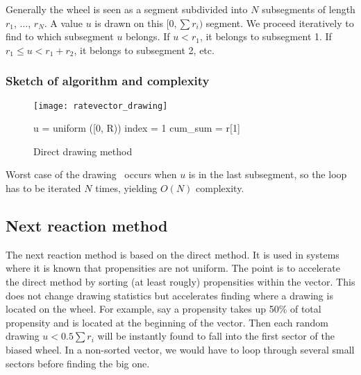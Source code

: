 Generally the wheel is seen as a segment subdivided into $N$ subsegments of length $r_1$, ..., $r_N$. A value $u$ is drawn on this $[0, \sum r_i)$ segment. We proceed iteratively to find to which subsegment $u$ belongs. If $u < r_1$, it belongs to subsegment 1. If $r_1 \leq u < r_1+r_2$, it belongs to subsegment 2, etc.

\subsubsection {Sketch of algorithm and complexity} 

\begin{figure}[!h]
  \begin{minipage}{0.5\textwidth}
    \texttt{[image: ratevector\_drawing]}
  \end{minipage}
  \begin{minipage}{0.5\textwidth}
    \begin{algorithm}[H]
      u = uniform ([0, R))\;
        index = 1\;
        cum\_sum = r[1]\;
    \end{algorithm}
  \end{minipage}
  \caption{Direct drawing method}
  \label{fig:direct_drawing}
\end {figure}

Worst case of the drawing~ occurs when $u$ is in the last subsegment, so the loop has to be iterated $N$ times, yielding $O(N)$ complexity.

\subsection {Next reaction method}

The next reaction method is based on the direct method. It is used in systems where it is known that propensities are not uniform. The point is to accelerate the direct method by sorting (at least rougly) propensities within the vector. This does not change drawing statistics but accelerates finding where a drawing is located on the wheel. For example, say a propensity takes up 50\% of total propensity and is located at the beginning of the vector. Then each random drawing $u < 0.5\sum r_i$ will be instantly found to fall into the first sector of the biased wheel. In a non-sorted vector, we would have to loop through several small sectors before finding the big one.

